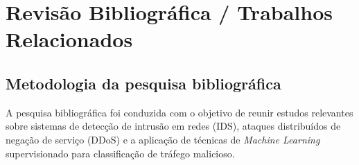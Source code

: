 \documentclass[
    12pt,                %
    openright,           %
    oneside,             %
    a4paper,             %
    english,             %
    brazil               %
]{abntex2}
\begin{document}
\chapter{Revisão Bibliográfica / Trabalhos Relacionados}
\label{cap:revisao}

\section{Metodologia da pesquisa bibliográfica}
\label{sec:metodologia_pesquisa_bib}

A pesquisa bibliográfica foi conduzida com o objetivo de reunir estudos relevantes sobre sistemas de detecção de intrusão em redes (IDS), ataques distribuídos de negação de serviço (DDoS) e a aplicação de técnicas de \textit{Machine Learning} supervisionado para classificação de tráfego malicioso.
\end{document}
